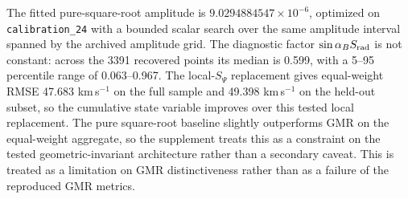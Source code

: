 \documentclass[twocolumn]{aastex701}
\begin{document}
The fitted pure-square-root amplitude is $9.0294884547\times10^{-6}$, optimized on \texttt{calibration\_24} with a bounded scalar search over the same amplitude interval spanned by the archived amplitude grid. The diagnostic factor $\sin\alpha_B S_{\rm rad}$ is not constant: across the 3391 recovered points its median is 0.599, with a 5--95 percentile range of 0.063--0.967. The local-$S_\Psi$ replacement gives equal-weight RMSE 47.683 km\,s$^{-1}$ on the full sample and 49.398 km\,s$^{-1}$ on the held-out subset, so the cumulative state variable improves over this tested local replacement. The pure square-root baseline slightly outperforms GMR on the equal-weight aggregate, so the supplement treats this as a constraint on the tested geometric-invariant architecture rather than a secondary caveat. This is treated as a limitation on GMR distinctiveness rather than as a failure of the reproduced GMR metrics.
\end{document}
